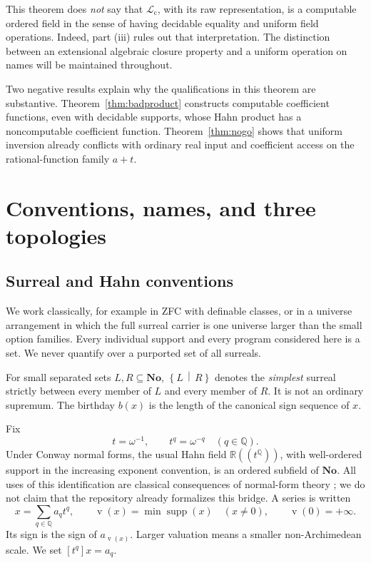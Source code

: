 \documentclass[11pt,letterpaper]{article}
\numberwithin{equation}{section}
\theoremstyle{definition}
\theoremstyle{remark}
\newcommand{\No}{\mathbf{No}}
\newcommand{\Lc}{\mathcal L_{\mathrm c}}
\newcommand{\Q}{\mathbb Q}
\newcommand{\R}{\mathbb R}
\newcommand{\supp}{\operatorname{supp}}
\newcommand{\val}{\operatorname{v}}
\newcommand{\coef}[2]{[t^{#1}]#2}
\newcommand{\cut}[2]{\left\{#1\,\middle|\,#2\right\}}
\begin{document}
This theorem does \emph{not} say that $\Lc$, with its raw representation, is
a computable ordered field in the sense of having decidable equality and
uniform field operations. Indeed, part (iii) rules out that interpretation.
The distinction between an extensional algebraic closure property and a
uniform operation on names will be maintained throughout.

Two negative results explain why the qualifications in this theorem are
substantive. Theorem~\ref{thm:badproduct} constructs computable coefficient
functions, even with decidable supports, whose Hahn product has a
noncomputable coefficient function. Theorem~\ref{thm:nogo} shows that
uniform inversion already conflicts with ordinary real input and coefficient
access on the rational-function family $a+t$.

\section{Conventions, names, and three topologies}
\label{sec:conventions}

\subsection{Surreal and Hahn conventions}

We work classically, for example in ZFC with definable classes, or in a
universe arrangement in which the full surreal carrier is one universe
larger than the small option families. Every individual support and every
program considered here is a set. We never quantify over a purported set of
all surreals.

For small separated sets $L,R\subseteq\No$, $\cut LR$ denotes the
\emph{simplest} surreal strictly between every member of $L$ and every
member of $R$. It is not an ordinary supremum. The birthday $b(x)$ is the
length of the canonical sign sequence of $x$.

Fix
\[
 t=\omega^{-1},\qquad t^q=\omega^{-q}\quad(q\in\Q).
\]
Under Conway normal forms, the usual Hahn field $\R((t^\Q))$, with
well-ordered support in the increasing exponent convention, is an ordered
subfield of $\No$. All uses of this identification are classical consequences
of normal-form theory \cite{conway,gonshor}; we do not claim that the
repository already formalizes this bridge. A series is written
\[
 x=\sum_{q\in\Q}a_qt^q,\qquad
 \val(x)=\min\supp(x)\quad(x\ne0),\qquad \val(0)=+\infty.
\]
Its sign is the sign of $a_{\val(x)}$. Larger valuation means a smaller
non-Archimedean scale. We set $\coef qx=a_q$.
\end{document}
